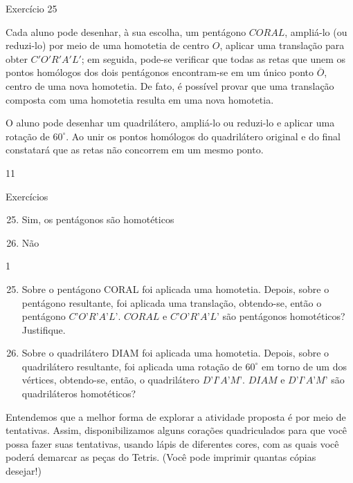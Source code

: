 \clearpage
\begin{sugestions}{Exercício 25}
{
Cada aluno pode desenhar, à sua escolha, um pentágono $CORAL$, ampliá-lo (ou reduzi-lo) por meio de uma homotetia de centro $O$, aplicar uma translação para obter $C'O'R'A'L'$; em seguida, pode-se verificar que todas as retas que unem os pontos homólogos dos dois pentágonos encontram-se em um único ponto $\overline{O}$, centro de uma nova homotetia. De fato, é possível provar que uma translação composta com uma homotetia resulta em uma nova homotetia.


O aluno pode desenhar um quadrilátero, ampliá-lo ou reduzi-lo e aplicar uma rotação de $60^{\circ}$. Ao unir os pontos homólogos do quadrilátero original e do final constatará que as retas não concorrem em um mesmo ponto. 
}{1}{1}
\end{sugestions}

\begin{answer}{Exercícios}
{\exerciselist
\begin{enumerate}\setcounter{enumi}{24}
\item Sim, os pentágonos são homotéticos
\item Não
\end{enumerate}
}{1}
\end{answer}

\begin{enumerate}\setcounter{enumi}{24}
\item Sobre o pentágono CORAL foi aplicada uma homotetia. Depois, sobre o pentágono resultante, foi aplicada uma translação, obtendo-se, então o pentágono $C’O’R’A’L’$. $CORAL$ e $C’O’R’A’L’$ são pentágonos homotéticos? Justifique. 

\item Sobre o quadrilátero DIAM foi aplicada uma homotetia. Depois, sobre o quadrilátero resultante, foi aplicada uma rotação de $60^{\circ}$ em torno de um dos vértices, obtendo-se, então, o quadrilátero $D’I’A’M’$. $DIAM$ e $D’I’A’M’$ são quadriláteros homotéticos?

\end{enumerate}



\ifnum{}
\clearpage
\else
\notasfinais
\fi

\anexo
Entendemos que a melhor forma de explorar a atividade proposta é por meio de tentativas. Assim, disponibilizamos alguns corações quadriculados para que você possa fazer suas tentativas, usando lápis de diferentes cores, com as quais você poderá demarcar as peças do Tetris. (Você pode imprimir quantas cópias desejar!)

